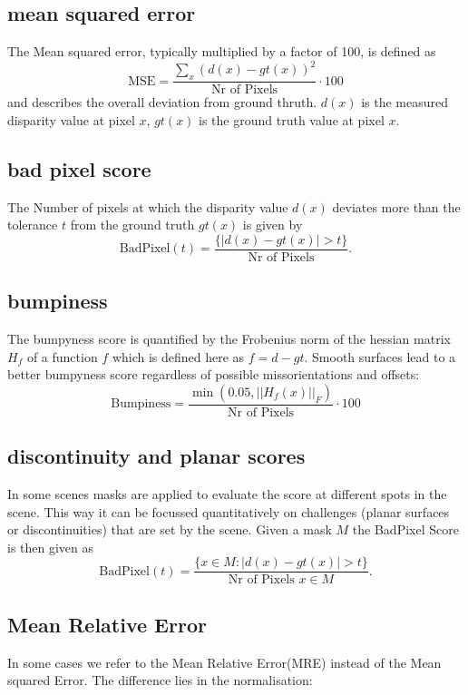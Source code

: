 \documentclass  [
  paper    = a4,
  BCOR     = 10mm,
  twoside,
  fontsize = 12pt,
  fleqn,
  toc      = bibnumbered,
  toc      = listofnumbered,
  numbers  = noendperiod,
  headings = normal,
  listof   = leveldown,
  version  = 3.03
]                                       {scrreprt}
\begin{document}
\subsection{mean squared error}
The Mean squared error, typically multiplied by a factor of 100, is defined as 
\begin{equation}\label{key}
\text{MSE} = \frac{\sum_x (d(x) - gt(x))^2}{\text{Nr of Pixels}} \cdot 100
\end{equation}
and describes the overall deviation from ground thruth. $d(x)$ is the measured disparity value at pixel $x$, $gt(x)$ is the ground truth value at pixel $x$. 
\subsection{bad pixel score}
The Number of pixels at which the disparity value $d(x)$ deviates more than the tolerance $t$ from the ground truth $gt(x)$ is given by
\begin{equation}\label{key}
\text{BadPixel}(t) = \frac{\{|d(x) - gt(x)| > t \}}{\text{Nr of Pixels}}.
\end{equation}
\subsection{bumpiness}
The bumpyness score is quantified by the Frobenius norm of the hessian matrix $H_f$ of a function $f$ which is defined here as $f = d-gt$. Smooth surfaces lead to a better bumpyness score regardless of possible missorientations and offsets:
\begin{equation}\label{key}
\text{Bumpiness} = \frac{\min(0.05, ||H_f(x)||_F)}{\text{Nr of Pixels}} \cdot 100
\end{equation}
\subsection{discontinuity and planar scores}
In some scenes masks are applied to evaluate the score at different spots in the scene. This way it can be focussed quantitatively on challenges (planar surfaces or discontinuities) that are set by the scene. Given a mask $M$ the BadPixel Score is then given as 
\begin{equation}\label{key}
\text{BadPixel}(t) = \frac{\{x \in M:|d(x) - gt(x)| > t \}}{\text{Nr of Pixels }x \in M}.
\end{equation}
\subsection{Mean Relative Error}
In some cases we refer to the Mean Relative Error(MRE) instead of the Mean squared Error. The difference lies in the normalisation:
\end{document}
